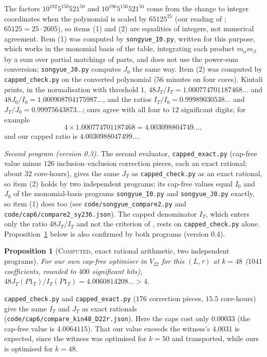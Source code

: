 \documentclass[11pt]{amsart}
\newtheorem{proposition}[theorem]{Proposition}
\theoremstyle{definition}
\theoremstyle{remark}
\newcommand{\lbl}[1]{\textup{\textsc{#1}}}
\begin{document}
The factors $10^{192}5^{150}521^{50}$ and $10^{196}5^{150}521^{50}$ come from the
change to integer coordinates when the polynomial is scaled by $65125^{25}$
(our reading of \cite[Eq.~(71)]{SY26}; $65125=25\cdot2605$), so items (1) and
(2) are equalities of integers, not numerical agreement. Item (1) was computed
by \texttt{songyue\_I0.py}, written for this purpose, which works in the monomial basis of
the table, integrating each product $m_\alpha m_\beta$ by a sum over partial
matchings of parts, and does not use the power-sum conversion;
\texttt{songyue\_J0.py} computes $J_0$ the same way. Item (2) was
computed by \texttt{capped\_check.py} on the converted polynomial ($56$ minutes
on four cores). Kintali \cite{Kin26} prints, in the normalisation with
threshold $1$, $48J_T/I_T=1.000774701187468\ldots$ and
$48J_0/I_0=1.000908704175987\ldots$, and the ratios $I_T/I_0=0.99989030538\ldots$
and $J_T/J_0=0.99975643873\ldots$; ours agree with all four to $12$
significant digits; for example
\[4\times1.000774701187468=4.003098804749\ldots,\]
and our capped ratio is $4.0030988047499\ldots$.

\emph{Second program (version 0.3).} The second evaluator,
\texttt{capped\_exact.py} (cap-free value minus $126$ inclusion--exclusion
correction pieces, each an exact rational; about $32$ core-hours), gives the
same $J_T$ as \texttt{capped\_check.py} as an exact rational, so item (2)
holds by two independent programs; its cap-free values equal $I_0$ and $J_0$
of the monomial-basis programs \texttt{songyue\_I0.py} and
\texttt{songyue\_J0.py} exactly, so item (1) does too (see
\texttt{code/}\allowbreak\texttt{songyue\_compare2.py} and
\texttt{code/}\allowbreak\texttt{cap6/}\allowbreak\texttt{compare2\_sy236.json}).
The capped denominator $I_T$, which enters only the ratio $48J_T/I_T$ and not
the criterion of \cite{SY26}, rests on \texttt{capped\_check.py} alone.
Proposition~\ref{prop:kin-own} below is also confirmed by both programs
(version 0.4).

\begin{proposition}[\lbl{Computed}, exact rational arithmetic, two independent programs]\label{prop:kin-own}
For our own cap-free optimiser in $V_{22}$ for this $(L,\tau)$ at $k=48$
($1041$ coefficients, rounded to $400$ significant bits),
$48J_T(P1_T)/I_T(P1_T)=4.0060814208\ldots>4$.
\end{proposition}

\texttt{capped\_check.py} and \texttt{capped\_exact.py} ($176$ correction
pieces, $15.5$ core-hours) give the same $I_T$ and $J_T$ as exact rationals
(\texttt{code/}\allowbreak\texttt{cap6/}\allowbreak\texttt{compare\_kin48\_D22r.json}).
Here the caps cost only $0.00033$ (the cap-free value is $4.0064115$). That our
value exceeds the witness's $4.0031$ is expected, since the witness was
optimised for $k=50$ and transported, while ours is optimised for $k=48$.
\end{document}
